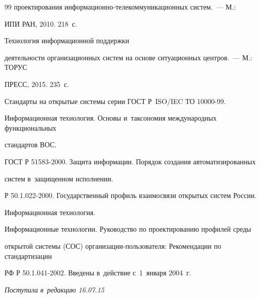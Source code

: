 {{\begin{thebibliography}{99}
проектирования информационно-телекоммуникационных систем.~--- М.: 

ИПИ РАН, 2010. 218~с.


       Технология информационной поддержки 

деятельности организационных систем на основе ситуационных центров.~--- М.: ТОРУС 

ПРЕСС, 2015. 235~с.


      Стандарты на открытые системы серии ГОСТ Р~ISO/IEC ТО 10000-99. 

Информационная технология. Основы и~таксономия международных функциональных 

стандартов ВОС.


      ГОСТ Р 51583-2000. Защита информации. Порядок создания автоматизированных 

систем в~защищенном исполнении. 




      Р 50.1.022-2000. Государственный профиль взаимосвязи открытых систем России. 

Информационная технология.




      Информационные технологии. Руководство по проектированию профилей среды 

открытой системы (СОС) организации-пользователя: Рекомендации по стандартизации 

РФ Р 50.1.041-2002. Введены в~действие с~1~января 2004~г.



   \end{thebibliography}

} }





\vspace*{-4pt}



\hfill{\small\textit{Поступила в~редакцию 16.07.15}}









\vspace*{7pt}



